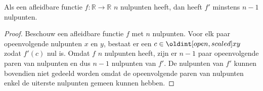 \documentclass[main.tex]{subfiles}
\begin{document}
\begin{lem}
  \label{lem:aantal-nulpunten-van-afgeleide}
  Als een afleidbare functie $f: \mathbb{R} \rightarrow \mathbb{R}$ $n$ nulpunten heeft, dan heeft $f'$ minstens $n-1$ nulpunten.
  
  \begin{proof}
    Beschouw een afleidbare functie $f$ met $n$ nulpunten.
    Voor elk paar opeenvolgende nulpunten $x$ en $y$, bestaat er een $c\in \interval[open]{x}{y}$ zodat $f'(c)$ nul is.
    Omdat $f$ $n$ nulpunten heeft, zijn er $n-1$ paar opeenvolgende paren van nulpunten en dus $n-1$ nulpunten van $f'$.
    De nulpunten van $f'$ kunnen bovendien niet gedeeld worden omdat de opeenvolgende paren van nulpunten enkel de uiterste nulpunten gemeen kunnen hebben.
  \end{proof}
\end{lem}
\end{document}
